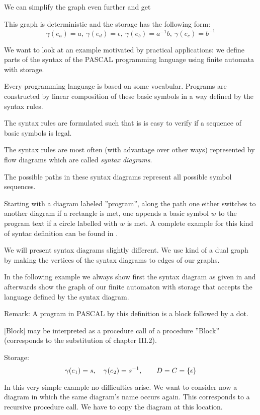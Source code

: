 \missingfigure

We can simplify the graph even further and get

\missingfigure

This graph is deterministic and the storage has the following form:
\[ \gamma(e_a) = a,\ \gamma(e_d) = \epsilon,\ \gamma(e_b) = a^{-1} b,\
\gamma(e_c) = b^{-1} \]

\bigskip
We want to look at an example motivated by practical applications: we define
parts of the syntax of the PASCAL programming language using finite automata
with storage.

Every programming language is based on some vocabular. Programs are constructed
by linear composition of these basic symbols in a way defined by the syntax
rules.

The syntax rules are formulated such that is is easy to verify if a sequence of
basic symbols is legal.

The syntax rules are most often (with advantage over other ways) represented by
flow diagrams which are called {\em syntax diagrams}.

The possible paths in these syntax diagrams represent all possible symbol
sequences.

Starting with a diagram labeled ''program'', along the path one either switches
to another diagram if a rectangle is met, one appends a basic symbol $w$ to the
program text if a circle labelled with $w$ is met. A complete example for this
kind of syntac definition can be found in \cite{Wirth}.

We will present syntax diagrams slightly different. We use kind of a dual graph
by making the vertices of the syntax diagrams to edges of our graphs.

In the following example we always show first the syntax diagram as given in
\cite{Wirth} and afterwards show the graph of our finite automaton with storage
that accepts the language defined by the syntax diagram.

\missingfigure

Remark: A program in PASCAL by this definition is a block followed by a dot.

\missingfigure

[Block] may be interpreted as a procedure call of a procedure ''Block''
(corresponds to the substitution of chapter III.2).

Storage:
\[ \gamma(e_1) = s,\quad \gamma(e_2) = s^{-1},\qquad D = C = \mbox{$\{\epsilon\}$} \]

In this very simple example no difficulties arise. We want to consider now a
diagram in which the same diagram's name occurs again. This corresponds to a
recursive procedure call. We have to copy the diagram at this location.


